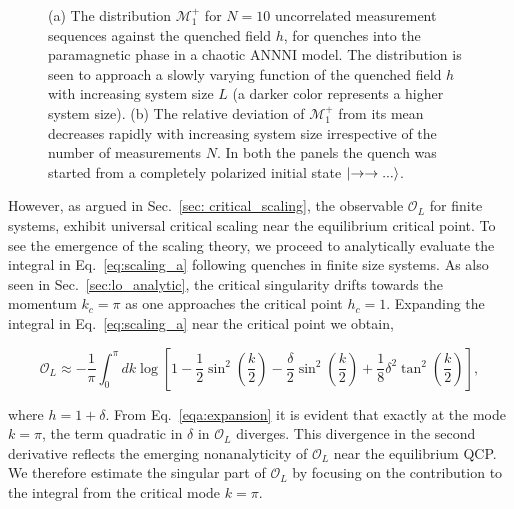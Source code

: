 \documentclass[aps,prx,twocolumn]{revtex4-2}
\begin{document}
{{\begin{figure*}
	\caption{(a) The distribution $\mathcal{M}_1^+$ for $N=10$ uncorrelated measurement sequences against the quenched field $h$, for quenches into the paramagnetic phase in a chaotic ANNNI model. The distribution is seen to approach a slowly varying function of the quenched field $h$ with increasing system size $L$ (a darker color represents a higher system size). (b) The relative deviation of $\mathcal{M}_1^+$ from its mean decreases rapidly with increasing system size irrespective of the number of measurements $N$. In both the panels the quench was started from a completely polarized initial state $\ket{\rightarrow\rightarrow...}$.}
\end{figure*}
However, as argued in Sec.~\ref{sec: critical_scaling}, the observable $\mathcal{O}_L$ for finite systems, exhibit universal critical scaling near the equilibrium critical point. To see the emergence of the scaling theory, we proceed to analytically evaluate the integral in Eq.~\eqref{eq:scaling_a} following quenches in finite size systems. As also seen in Sec.~\ref{sec:lo_analytic}, the critical singularity drifts towards the momentum $k_c=\pi$ as one approaches the critical point $h_c=1$. Expanding the integral in Eq.~\eqref{eq:scaling_a} near the critical point we obtain,
\begin{widetext}
\begin{equation}\label{eqa:expansion}
	\mathcal{O}_L\approx-\frac{1}{\pi}\int_{0}^{\pi}dk\log\left[1-\frac{1}{2}\sin ^2\left(\frac{k}{2}\right)-\frac{\delta}{2}\sin ^2\left(\frac{k}{2}\right)+\frac{1}{8} \delta ^2 \tan ^2\left(\frac{k}{2}\right)\right],
\end{equation}
\end{widetext}
where $h=1+\delta$.
From Eq.~\eqref{eqa:expansion} it is evident that exactly at the mode $k=\pi$, the term quadratic in $\delta$ in $\mathcal{O}_L$ diverges. This divergence in the second derivative reflects the emerging nonanalyticity of $\mathcal{O}_L$ near the equilibrium QCP. We therefore estimate the singular part of $\mathcal{O}_L$ by focusing on the contribution to the integral from the critical mode $k=\pi$.\\

}}
\end{document}
